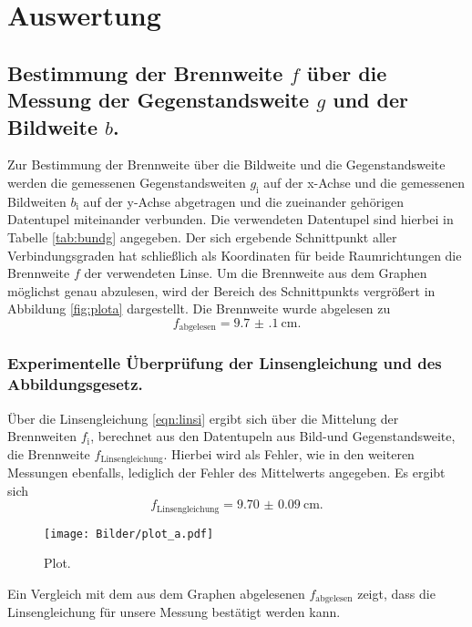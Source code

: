 \section{Auswertung}
\label{sec:Auswertung}
\subsection{Bestimmung der Brennweite $f$ über die Messung der Gegenstandsweite $g$ und der Bildweite $b$.}
Zur Bestimmung der Brennweite über die Bildweite und die Gegenstandsweite werden die gemessenen Gegenstandsweiten $g_{\mathrm{i}}$ auf der x-Achse und die gemessenen Bildweiten $b_{\mathrm{i}}$ auf der y-Achse abgetragen und die zueinander gehörigen Datentupel miteinander verbunden.
Die verwendeten Datentupel sind hierbei in Tabelle \ref{tab:bundg} angegeben.
Der sich ergebende Schnittpunkt aller Verbindungsgraden hat schließlich als Koordinaten für beide Raumrichtungen die Brennweite $f$ der verwendeten Linse. Um die Brennweite aus dem Graphen möglichst genau abzulesen, wird der Bereich des Schnittpunkts vergrößert in Abbildung \ref{fig:plota} dargestellt.
Die Brennweite wurde abgelesen zu
\begin{equation}
  f_{\mathrm{abgelesen}}=\SI{9.7(1)}{\centi\meter}\text{.}
\end{equation}
\subsubsection{Experimentelle Überprüfung der Linsengleichung und des Abbildungsgesetz.}
Über die Linsengleichung \eqref{eqn:linsi} ergibt sich über die Mittelung der Brennweiten $f_{\mathrm{i}}$, berechnet aus den Datentupeln aus Bild-und Gegenstandsweite, die Brennweite $f_{\mathrm{Linsengleichung}}$.
Hierbei wird als Fehler, wie in den weiteren Messungen ebenfalls, lediglich der Fehler des Mittelwerts angegeben.
Es ergibt sich
\begin{equation}
  f_{\mathrm{Linsengleichung}}=\SI{9.70(9)}{\centi\meter}\text{.}
\end{equation}

\begin{figure}
  \centering
  \texttt{[image: Bilder/plot\_a.pdf]}
  \caption{Plot.}
  \label{fig:plot}
\end{figure}
Ein Vergleich mit dem aus dem Graphen abgelesenen $f_{\mathrm{abgelesen}}$ zeigt, dass die Linsengleichung für unsere Messung bestätigt werden kann.


